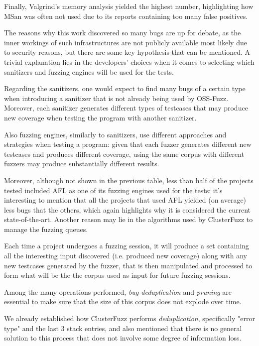 Finally, Valgrind's memory analysis yielded the highest number, highlighting how MSan was often not used due to its reports containing too many false positives.

The reasons why this work discovered so many bugs are up for debate, as the inner workings of such infrastructures are not publicly available most likely due to security reasons, but there are some key hypothesis that can be mentioned.
A trivial explanation lies in the developers' choices when it comes to selecting which sanitizers and fuzzing engines will be used for the tests.

Regarding the sanitizers, one would expect to find many bugs of a certain type when introducing a sanitizer that is not already being used by OSS-Fuzz. Moreover, each sanitizer generates different types of testcases that may produce new coverage when testing the program with another sanitizer.

Also fuzzing engines, similarly to sanitizers, use different approaches and strategies when testing a program: given that each fuzzer generates different new testcases and produces different coverage, using the same corpus with different fuzzers may produce substantially different results.

Moreover, although not shown in the previous table, less than half of the projects tested included AFL as one of its fuzzing engines used for the tests: it's interesting to mention that all the projects that used AFL yielded (on average) less bugs that the others, which again highlights why it is considered the current state-of-the-art.
Another reason may lie in the algorithms used by ClusterFuzz to manage the fuzzing queues.

Each time a project undergoes a fuzzing session, it will produce a set containing all the interesting input discovered (i.e. produced new coverage) along with any new testcases generated by the fuzzer, that is then manipulated and processed to form what will be the the corpus used as input for future fuzzing sessions. 

Among the many operations performed, \textit{bug deduplication} and \textit{pruning} are essential to make sure that the size of this corpus does not explode over time.

We already established how ClusterFuzz performs \textit{deduplication}, specifically "error type" and the last 3 stack entries, and also mentioned that there is no general solution to this process that does not involve some degree of information loss.

